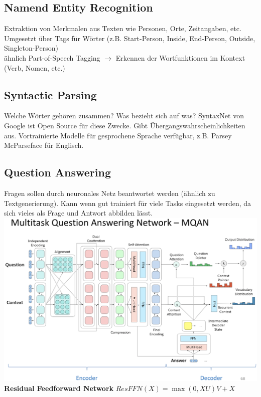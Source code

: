 \documentclass[12pt]{article}
\begin{document}
	\subsection{Namend Entity Recognition}
	Extraktion von Merkmalen aus Texten wie Personen, Orte, Zeitangaben, etc. Umgesetzt über Tags für Wörter (z.B. Start-Person, Inside, End-Person, Outside, Singleton-Person)\\
	ähnlich Part-of-Speech Tagging $\rightarrow$ Erkennen der Wortfunktionen im Kontext (Verb, Nomen, etc.)

	\subsection{Syntactic Parsing}
	Welche Wörter gehören zusammen? Was bezieht sich auf was? SyntaxNet von Google ist Open Source für diese Zwecke. Gibt Übergangswahrscheinlichkeiten aus. Vortrainierte Modelle für gesprochene Sprache verfügbar, z.B. Parsey McParseface für Englisch.

	\subsection{Question Answering}
	Fragen sollen durch neuronales Netz beantwortet werden (ähnlich zu Textgenerierung). Kann wenn gut trainiert für viele Tasks eingesetzt werden, da sich vieles als Frage und Antwort abbilden lässt.\\
	\includegraphics[width=\linewidth]{figures/mqan.png}\\
	\textbf{Residual Feedforward Network} $ResFFN(X) = \max(0, XU) V + X$\\
\end{document}
